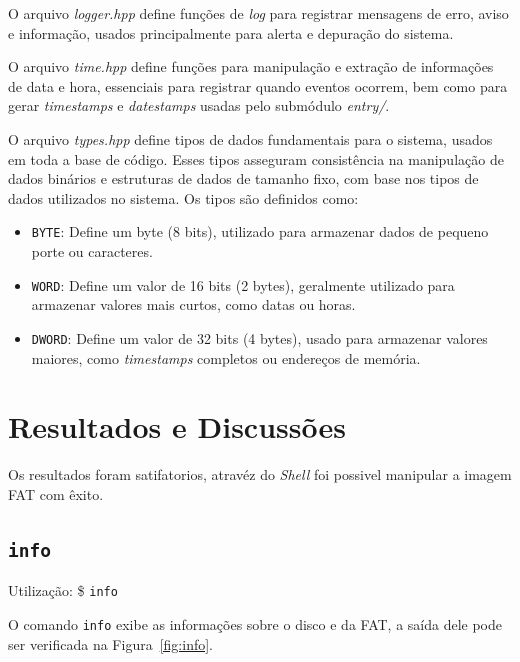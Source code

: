 \documentclass[
    12pt,				%
    oneside,   	        %
    a4paper,			%
    english,			%
    french,				%
    spanish,			%
    brazil,				%
    ]{pacotes/abntex2}
\begin{document}
O arquivo \textit{logger.hpp} define funções de \textit{log} para registrar mensagens de erro, aviso e informação, usados principalmente para alerta e depuração do sistema.

O arquivo \textit{time.hpp} define funções para manipulação e extração de informações de data e hora, essenciais para registrar quando eventos ocorrem, bem como para gerar \textit{timestamps} e \textit{datestamps} usadas pelo submódulo \textit{entry/}.

O arquivo \textit{types.hpp} define tipos de dados fundamentais para o sistema, usados em toda a base de código. Esses tipos asseguram consistência na manipulação de dados binários e estruturas de dados de tamanho fixo, com base nos tipos de dados utilizados no sistema. Os tipos são definidos como:

\begin{itemize}
    \item \texttt{BYTE}: Define um byte (8 bits), utilizado para armazenar dados de pequeno porte ou caracteres.
    
    \item \texttt{WORD}: Define um valor de 16 bits (2 bytes), geralmente utilizado para armazenar valores mais curtos, como datas ou horas.
    
    \item \texttt{DWORD}: Define um valor de 32 bits (4 bytes), usado para armazenar valores maiores, como \textit{timestamps} completos ou endereços de memória.
\end{itemize}


\graphicspath{ {./figuras/resultados} }

\section{Resultados e Discussões}
\label{sec:resultados}
Os resultados foram satifatorios, atravéz do \textit{Shell} foi possivel manipular a imagem FAT com êxito.


\subsection{\texttt{info}}
\label{subsec:info}
 Utilização: \$ \texttt{info}
 
 O comando \texttt{info} exibe as informações sobre o disco e da FAT, a saída dele pode ser verificada na Figura~\ref{fig:info}.
\end{document}
